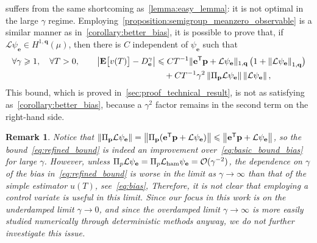 \documentclass[11pt,a4paper]{article}
\newcommand{\expect}[0]{\mathbf{E}}
\newcommand{\vect}[1]{\boldsymbol{\mathbf #1}}
\renewcommand{\t}{\mathsf T}
\theoremstyle{plain}
\newtheorem{remark}{Remark}[section]
\numberwithin{equation}{section}
\renewcommand{\leq}{\leqslant}
\renewcommand{\geq}{\geqslant}
\begin{document}
 suffers from the same shortcoming as~\cref{lemma:easy_lemma}:
it is not optimal in the large $\gamma$ regime.
Employing~\cref{proposition:semigroup_meanzero_observable} is a similar manner as in~\cref{corollary:better_bias},
it is possible to prove that,
if $\mathcal L \psi_{\vect e} \in H^{1,\vect q}(\mu)$,
then there is $C$ independent of $\psi_{\vect e}$ such that
\begin{align}
    \notag
    \forall \gamma \geq 1, \quad
    \forall T > 0, \qquad
    \abs{\expect \bigl[ v(T) \bigr] - D_{\vect e}^{\gamma}}
        &\leq C T^{-1}
        \norm*{\vect e^\t \vect p +  \mathcal L \psi_{\vect e}}[1,\vect q] \, \bigl(1 + \norm{\mathcal L \psi_{\vect e}}[1,\vect q] \bigr) \\
        \label{eq:refined_bound}
        &\quad + C T^{-1} \gamma^2 \norm{\Pi_{\vect p} \mathcal L \psi_{\vect e}} \norm{\mathcal L \psi_{\vect e}},
\end{align}
This bound, which is proved in~\cref{sec:proof_technical_result},
is not as satisfying as~\cref{corollary:better_bias},
because a $\gamma^2$ factor remains in the second term on the right-hand side.
\begin{remark}
    Notice that $\norm{\Pi_{\vect p} \mathcal L \psi_{\vect e}} = \norm{\Pi_{\vect p} (\vect e^\t \vect p + \mathcal L \psi_{\vect e})} \leq \norm{\vect e^\t \vect p + \mathcal L \psi_{\vect e}}$,
    so the bound~\eqref{eq:refined_bound} is indeed an improvement over~\eqref{eq:basic_bound_bias} for large $\gamma$.
    However,
    unless $\Pi_p \mathcal L \psi_{\vect e} = \Pi_p \mathcal L_{\rm ham} \psi_{\vect e} = \mathcal O(\gamma^{-2})$,
    the dependence on $\gamma$ of the bias in~\eqref{eq:refined_bound} is worse in the limit as $\gamma \to \infty$
    than that of the simple estimator $u(T)$, see~\eqref{eq:bias},
    Therefore, it is not clear that employing a control variate is useful in this limit.
    Since our focus in this work is on the underdamped limit $\gamma \to 0$,
    and since the overdamped limit $\gamma \to \infty$ is more easily studied numerically through deterministic methods anyway,
    we do not further investigate this issue.
\end{remark}
\end{document}
